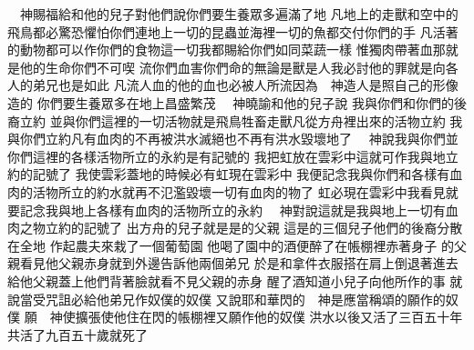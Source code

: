\bchapter%
　神賜福給和他的兒子\chientien 對他們說\chientien 你們要生養眾多\chientien 遍滿了地\chuan 
{}凡地上的走獸\chientien 和空中的飛鳥\chientien 都必驚恐\chientien 懼怕你們\yuentien 連地上一切的昆蟲\chientien 並海裡一切的魚\chientien 都交付你們的手\chuan 
{}凡活著的動物\chientien 都可以作你們的食物\chientien 這一切我都賜給你們如同菜蔬一樣\chuan 
{}惟獨肉帶著血\chientien 那就是他的生命\chientien 你們不可喫\chuan 
{}流你們血害你們命的\chientien 無論是獸\chientien 是人\chientien 我必討他的罪\chientien 就是向各人的弟兄也是如此\chuan 
{}凡流人血的\chientien 他的血也必被人所流\chientien 因為　神造人\chientien 是照自己的形像造的\chuan
{}你們要生養眾多\chientien 在地上昌盛繁茂\chuan\Chuan
{}　神曉諭和他的兒子說\chientien 
{}我與你們和你們的後裔立約\yuentien 
{}並與你們這裡的一切活物\chientien 就是飛鳥\chientien 牲畜\chientien 走獸\yuentien 凡從方舟裡出來的活物立約\chuan 
{}我與你們立約\chientien 凡有血肉的\chientien 不再被洪水滅絕\chientien 也不再有洪水毀壞地了\chuan 
{}　神說\chientien 我與你們\chientien 並你們這裡的各樣活物所立的永約\chientien 是有記號的\chuan 
{}我把虹放在雲彩中\chientien 這就可作我與地立約的記號了\chuan 
{}我使雲彩蓋地的時候\chientien 必有虹現在雲彩中\yuentien 
{}我便記念我與你們\chientien 和各樣有血肉的活物所立的約\chientien 水就再不氾濫毀壞一切有血肉的物了\chuan 
{}虹必現在雲彩中\chientien 我看見\chientien 就要記念我與地上各樣有血肉的活物所立的永約\chuan 
{}　神對說\chientien 這就是我與地上一切有血肉之物立約的記號了\chuan\Chuan
{}出方舟的兒子\chientien 就是\chientien{}\chientien{}\yuentien{}是的父親\chuan 
{}這是的三個兒子\yuentien 他們的後裔分散在全地\chuan\Chuan
{}作起農夫來\chientien 栽了一個葡萄園\chuan 
{}他喝了園中的酒便醉了\yuentien 在帳棚裡赤著身子\chuan 
{}的父親\chientien 看見他父親赤身\chientien 就到外邊告訴他兩個弟兄\chuan 
{}於是和\chientien 拿件衣服搭在肩上\chientien 倒退著進去\chientien 給他父親蓋上\chientien 他們背著臉就看不見父親的赤身\chuan 
{}醒了酒\chientien 知道小兒子向他所作的事\chientien 
{}就說\chientien{}當受咒詛\chientien 必給他弟兄作奴僕的奴僕\chuan 
{}又說\chientien 耶和華閃的　神\chientien 是應當稱頌的\chientien 願作的奴僕\chuan 
{}願　神使擴張\chientien 使他住在閃的帳棚裡\yuentien 又願作他的奴僕\chuan\Chuan
{}洪水以後\chientien{}又活了三百五十年\chuan 
{}共活了九百五十歲就死了\chuan 
